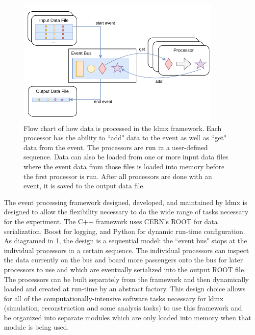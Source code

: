 \begin{figure}
	\centering
	\includegraphics[width=0.9\textwidth]{figures/ldmx/simulation/FrameworkFlowChart.drawio.pdf}
	\caption{Flow chart of how data is processed in the \ac{ldmx} framework. Each processor has the ability to ``add" data to the event as well as ``get" data from the event. The processors are run in a user-defined sequence. Data can also be loaded from one or more input data files where the event data from those files is loaded into memory before the first processor is run. After all processors are done with an event, it is saved to the output data file.}
	\label{fig:ldmx:sim:data-flow}
\end{figure}

The event processing framework designed, developed, and maintained by \ac{ldmx} is designed to allow the flexibility necessary to do the wide range of tasks necessary for the experiment. The C++ framework uses CERN's ROOT \cite{cernroot} for data serialization, Boost  for logging, and Python \cite{python} for dynamic run-time configuration. As diagramed in \cref{fig:ldmx:sim:data-flow}, the design is a sequential model: the ``event bus" stops at the individual processors in a certain sequence. The individual processors can inspect the data currently on the bus and board more passengers onto the bus for later processors to use and which are eventually serialized into the output ROOT file. The processors can be built separately from the framework and then dynamically loaded and created at run-time by an abstract factory. This design choice allows for all of the computationally-intensive software tasks necessary for \ac{ldmx} (simulation, reconstruction and some analysis tasks) to use this framework and be organized into separate modules which are only loaded into memory when that module is being used.

